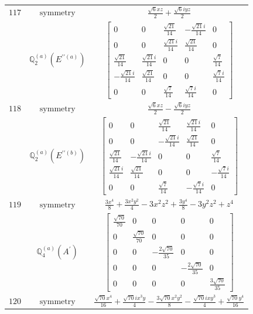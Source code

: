 \documentclass[fleqn,8pt,landscape]{jsarticle}
\begin{document}
\begin{longtable}{ccc}
$ 117 $ & $ \text{symmetry} $ & $ \frac{\sqrt{6} x z}{2} + \frac{\sqrt{6} i y z}{2} $ \\
$  $ & $ \mathbb{Q}_{2}^{(a)}(E^{\prime\prime(a)}) $ & $ \begin{bmatrix} 0 & 0 & \frac{\sqrt{21}}{14} & - \frac{\sqrt{21} i}{14} & 0 \\ 0 & 0 & \frac{\sqrt{21} i}{14} & \frac{\sqrt{21}}{14} & 0 \\ \frac{\sqrt{21}}{14} & \frac{\sqrt{21} i}{14} & 0 & 0 & \frac{\sqrt{7}}{14} \\ - \frac{\sqrt{21} i}{14} & \frac{\sqrt{21}}{14} & 0 & 0 & \frac{\sqrt{7} i}{14} \\ 0 & 0 & \frac{\sqrt{7}}{14} & \frac{\sqrt{7} i}{14} & 0 \end{bmatrix} $ \\ \hline
$ 118 $ & $ \text{symmetry} $ & $ \frac{\sqrt{6} x z}{2} - \frac{\sqrt{6} i y z}{2} $ \\
$  $ & $ \mathbb{Q}_{2}^{(a)}(E^{\prime\prime(b)}) $ & $ \begin{bmatrix} 0 & 0 & \frac{\sqrt{21}}{14} & \frac{\sqrt{21} i}{14} & 0 \\ 0 & 0 & - \frac{\sqrt{21} i}{14} & \frac{\sqrt{21}}{14} & 0 \\ \frac{\sqrt{21}}{14} & - \frac{\sqrt{21} i}{14} & 0 & 0 & \frac{\sqrt{7}}{14} \\ \frac{\sqrt{21} i}{14} & \frac{\sqrt{21}}{14} & 0 & 0 & - \frac{\sqrt{7} i}{14} \\ 0 & 0 & \frac{\sqrt{7}}{14} & - \frac{\sqrt{7} i}{14} & 0 \end{bmatrix} $ \\ \hline
$ 119 $ & $ \text{symmetry} $ & $ \frac{3 x^{4}}{8} + \frac{3 x^{2} y^{2}}{4} - 3 x^{2} z^{2} + \frac{3 y^{4}}{8} - 3 y^{2} z^{2} + z^{4} $ \\
$  $ & $ \mathbb{Q}_{4}^{(a)}(A^{\prime}) $ & $ \begin{bmatrix} \frac{\sqrt{70}}{70} & 0 & 0 & 0 & 0 \\ 0 & \frac{\sqrt{70}}{70} & 0 & 0 & 0 \\ 0 & 0 & - \frac{2 \sqrt{70}}{35} & 0 & 0 \\ 0 & 0 & 0 & - \frac{2 \sqrt{70}}{35} & 0 \\ 0 & 0 & 0 & 0 & \frac{3 \sqrt{70}}{35} \end{bmatrix} $ \\ \hline
$ 120 $ & $ \text{symmetry} $ & $ \frac{\sqrt{70} x^{4}}{16} + \frac{\sqrt{70} i x^{3} y}{4} - \frac{3 \sqrt{70} x^{2} y^{2}}{8} - \frac{\sqrt{70} i x y^{3}}{4} + \frac{\sqrt{70} y^{4}}{16} $ \\

\end{longtable}
\end{document}

